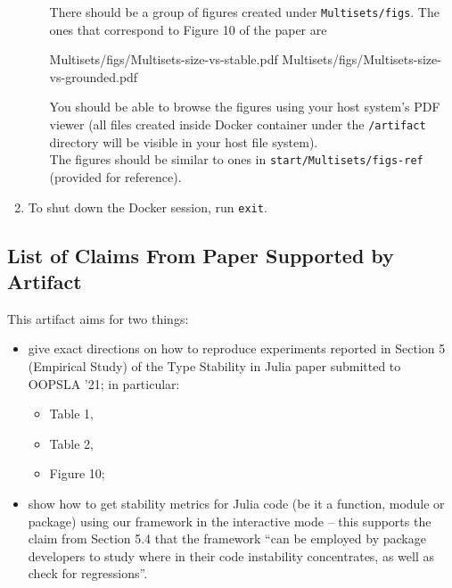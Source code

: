 \documentclass[
]{article}
\providecommand{\tightlist}{%
  \setlength{\itemsep}{0pt}\setlength{\parskip}{0pt}}
\begin{document}
\begin{enumerate}
\begin{enumerate}
    There should be a group of figures created under
    \texttt{Multisets/figs}. The ones that correspond to Figure 10 of
    the paper are

\begin{verbnobox}[\small]
Multisets/figs/Multisets-size-vs-stable.pdf
Multisets/figs/Multisets-size-vs-grounded.pdf
\end{verbnobox}

    You should be able to browse the figures using your host system's
    PDF viewer (all files created inside Docker container under the
    \texttt{/artifact} directory will be visible in your host file
    system).\\
    The figures should be similar to ones in
    \texttt{start/Multisets/figs-ref} (provided for reference).
  \end{enumerate}
\item
  To shut down the Docker session, run \texttt{exit}.
\end{enumerate}

\hypertarget{list-of-claims-from-paper-supported-by-artifact}{%
\subsection{List of Claims From Paper Supported by
Artifact}\label{list-of-claims-from-paper-supported-by-artifact}}

This artifact aims for two things:

\begin{itemize}
\item
  give exact directions on how to reproduce experiments reported in
  Section 5 (Empirical Study) of the Type Stability in Julia paper
  submitted to OOPSLA '21; in particular:

  \begin{itemize}
  \tightlist
  \item
    Table 1,
  \item
    Table 2,
  \item
    Figure 10;
  \end{itemize}
\item
  show how to get stability metrics for Julia code (be it a function,
  module or package) using our framework in the interactive mode -- this
  supports the claim from Section 5.4 that the framework ``can be
  employed by package developers to study where in their code
  instability concentrates, as well as check for regressions''.
\end{itemize}
\end{document}
